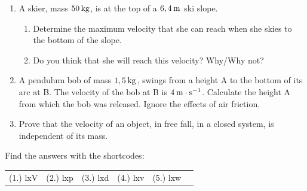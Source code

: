 \begin{enumerate}[noitemsep, label=\textbf{\arabic*}. ]
\label{m38786*uid99}\item A skier, mass \begin{math}50\phantom{\rule{2pt}{0ex}}\mathrm{kg}\end{math}, is at the top of a \begin{math}6,4\phantom{\rule{2pt}{0ex}}\mathrm{m}\end{math} ski slope.
\label{m38786*id70721}\begin{enumerate}[noitemsep, label=\textbf{\alph*}. ] 
            \label{m38786*uid100}\item Determine the maximum velocity that she can reach when she skies to the bottom of the slope.
\label{m38786*uid101}\item Do you think that she will reach this velocity? Why/Why not?
\end{enumerate}
                \label{m38786*uid102}\item A pendulum bob of mass \begin{math}1,5\phantom{\rule{2pt}{0ex}}\mathrm{kg}\end{math}, swings from a height A to the bottom of its arc at B. The velocity of the bob at B is \begin{math}4\phantom{\rule{2pt}{0ex}}\mathrm{m}\ensuremath{\cdot}\mathrm{s}{}^{-1}\end{math}. Calculate the height A from which the bob was released. Ignore the effects of air friction.\newline
            
\label{m38786*uid103}\item Prove that the velocity of an object, in free fall, in a closed system, is independent of its mass.\newline
            
\end{enumerate}
        
        

      
    
    
    \label{m38786*cid8}
\par {} Find the answers with the shortcodes:
 \par \begin{tabular}[h]{cccccc}
 (1.) lxV  &  (2.) lxp  &  (3.) lxd  &  (4.) lxv  &  (5.) lxw  & \end{tabular}




